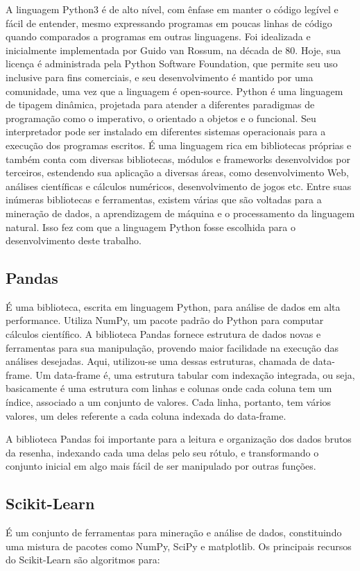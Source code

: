 \documentclass[tcc, capa]{texucpel}
\begin{document}
A linguagem Python3 é de alto nível, com ênfase em manter o código legível e fácil de entender, mesmo expressando programas em poucas linhas de código quando comparados a programas em outras linguagens.
Foi idealizada e inicialmente implementada por Guido van Rossum, na década de 80. Hoje, sua licença é administrada pela Python Software Foundation, que permite seu uso inclusive para fins comerciais, e seu desenvolvimento é mantido por uma comunidade, uma vez que a linguagem é open-source.
Python é uma linguagem de tipagem dinâmica, projetada para atender a diferentes paradigmas de programação como o imperativo, o orientado a objetos e o funcional. Seu interpretador pode ser instalado em diferentes sistemas operacionais para a execução dos programas escritos.
É uma linguagem rica em bibliotecas próprias e também conta com diversas bibliotecas, módulos e frameworks desenvolvidos por terceiros, estendendo sua aplicação a diversas áreas, como desenvolvimento Web, análises científicas e cálculos numéricos, desenvolvimento de jogos etc.
Entre suas inúmeras bibliotecas e ferramentas, existem várias que são voltadas para a mineração de dados, a aprendizagem de máquina e o processamento da linguagem natural.
Isso fez com que a linguagem Python fosse escolhida para o desenvolvimento deste trabalho.

\subsection{Pandas}
É uma biblioteca, escrita em linguagem Python, para análise de dados em alta performance. Utiliza NumPy, um pacote padrão do Python para computar cálculos científico. 
A biblioteca Pandas fornece estrutura de dados novas e ferramentas para sua manipulação, provendo maior facilidade na execução das análises desejadas.
Aqui, utilizou-se uma dessas estruturas, chamada de data-frame. Um data-frame é, uma estrutura tabular com indexação integrada, ou seja, basicamente é uma estrutura com linhas e colunas onde cada coluna tem um índice, associado a um conjunto de valores. Cada linha, portanto, tem vários valores, um deles referente a cada coluna indexada do data-frame.

A biblioteca Pandas foi importante para a leitura e organização dos dados brutos da resenha, indexando cada uma delas pelo seu rótulo, e transformando o conjunto inicial em algo mais fácil de ser manipulado por outras funções.

\subsection{Scikit-Learn}
É um conjunto de ferramentas para mineração e análise de dados, constituindo uma mistura de pacotes como NumPy, SciPy e matplotlib. Os principais recursos do Scikit-Learn são algoritmos para:
\end{document}
